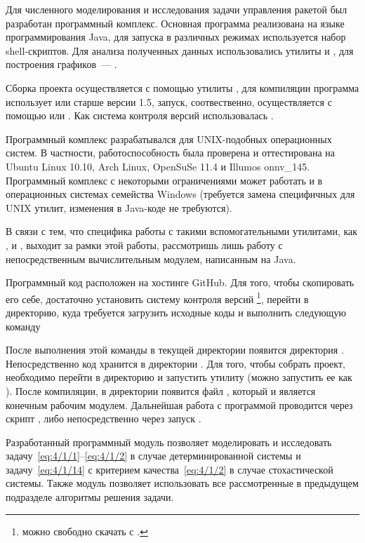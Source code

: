 Для численного моделирования и исследования задачи управления ракетой был разработан программный комплекс. Основная программа реализована на языке программирования Java, для запуска в различных режимах используется набор shell-скриптов. Для анализа полученных данных использовались утилиты  и , для построения графиков~--- .

Сборка проекта осуществляется с помощью утилиты , для компиляции программа использует  или  старше версии 1.5, запуск, соотвественно, осуществляется с помощью  или . Как система контроля версий использовалась .

Программный комплекс разрабатывался для UNIX-подобных операционных систем. В частности, работоспособность была проверена и оттестирована на Ubuntu Linux 10.10, Arch Linux, OpenSuSe 11.4 и Illumos onnv\_145. Программный комплекс с некоторыми ограничениями может работать и в операционных системах семейства Windows (требуется замена специфичных для UNIX утилит, изменения в Java-коде не требуются).

В связи с тем, что специфика работы с такими вспомогательными утилитами, как ,  и , выходит за рамки этой работы, рассмотришь лишь работу с непосредственным вычислительным модулем, написанным на Java.

\br

Программный код расположен на хостинге GitHub. Для того, чтобы скопировать его себе, достаточно установить систему контроля версий \footnote{ можно свободно скачать с .}, перейти в директорию, куда требуется загрузить исходные коды и выполнить следующую команду


После выполнения этой команды в текущей директории появится директория . Непосредственно код хранится в директории . Для того, чтобы собрать проект, необходимо перейти в директорию  и запустить утилиту  (можно запустить ее как ). После компиляции, в директории появится файл , который и является конечным рабочим модулем. Дальнейшая работа с программой проводится через скрипт , либо непосредственно через запуск .

\br

Разработанный программный модуль позволяет моделировать и исследовать задачу~\ref{eq:4/1/1}--\vref{eq:4/1/2} в случае детерминированной системы и задачу~\vref{eq:4/1/14} с критерием качества~\ref{eq:4/1/2} в случае стохастической системы. Также модуль позволяет использовать все рассмотренные в предыдущем подразделе алгоритмы решения задачи.

